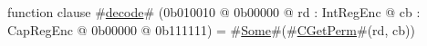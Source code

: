 function clause #\hyperref[zdecode]{decode}# (0b010010 @ 0b00000 @ rd : IntRegEnc @ cb : CapRegEnc @    0b00000 @ 0b111111) = #\hyperref[zSome]{Some}#(#\hyperref[zCGetPerm]{CGetPerm}#(rd, cb))
